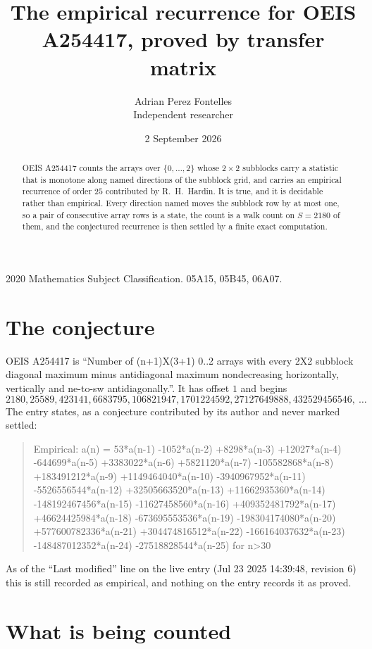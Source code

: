 \documentclass[11pt,a4paper]{article}
\title{The empirical recurrence for OEIS A254417, proved by transfer matrix}
\author{Adrian Perez Fontelles\\ \small Independent researcher}
\date{2 September 2026}
\theoremstyle{plain}
\theoremstyle{definition}
\begin{document}
\maketitle

\begin{abstract}
OEIS A254417 counts the arrays over $\{0,\dots,2\}$ whose $2\times2$ subblocks carry a
statistic that is monotone along named directions of the subblock grid, and carries an
empirical recurrence of order $25$ contributed by R.~H.~Hardin. It is true, and it is
decidable rather than empirical. Every direction named moves the subblock row by at most one,
so a pair of consecutive array rows is a state, the count is a walk count on $S=2180$ of them,
and the conjectured recurrence is then settled by a finite exact computation.
\end{abstract}

\noindent\small 2020 Mathematics Subject Classification. 05A15, 05B45, 06A07.\normalsize

\section{The conjecture}

OEIS A254417 is ``Number of (n+1)X(3+1) 0..2 arrays with every 2X2 subblock diagonal maximum minus antidiagonal maximum nondecreasing horizontally, vertically and ne-to-sw antidiagonally.''. It has offset $1$ and begins
\[
2180, 25589, 423141, 6683795, 106821947, 1701224592, 27127649888, 432529456546,\ \dots
\]
The entry states, as a conjecture contributed by its author and never marked settled:
\begin{quote}
Empirical: a(n) = 53*a(n-1) -1052*a(n-2) +8298*a(n-3) +12027*a(n-4) -644699*a(n-5) +3383022*a(n-6) +5821120*a(n-7) -105582868*a(n-8) +183491212*a(n-9) +1149464040*a(n-10) -3940967952*a(n-11) -5526556544*a(n-12) +32505663520*a(n-13) +11662935360*a(n-14) -148192467456*a(n-15) -11627458560*a(n-16) +409352481792*a(n-17) +46624425984*a(n-18) -673695553536*a(n-19) -198304174080*a(n-20) +577600782336*a(n-21) +304474816512*a(n-22) -166164037632*a(n-23) -148487012352*a(n-24) -27518828544*a(n-25) for n>30
\end{quote}
As of the ``Last modified'' line on the live entry (Jul 23 2025 14:39:48, revision 6) this is still
recorded as empirical, and nothing on the entry records it as proved.

\section{What is being counted}
\end{document}
